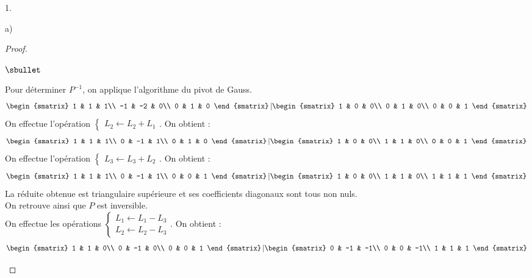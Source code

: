 \begin{noliste}{1.}
\begin{noliste}{a)}
\begin{proof}
\begin{noliste}{$\sbullet$}
	\item Pour déterminer $P^{-1}$, on applique l'algorithme du 
	pivot de Gauss.
	\[
	  \begin{smatrix}
	    1 & 1 & 1\\
	    -1 & -2 & 0\\
	    0 & 1 & 0
	  \end{smatrix}
	  \left\vert 
	  \begin{smatrix}
	    1 & 0 & 0\\
	    0 & 1 & 0\\
	    0 & 0 & 1
	  \end{smatrix}
	  \right.
	\]
	On effectue l'opération $\left\{
	\begin{array}{l}
	  L_2 \leftarrow L_2 + L_1
	\end{array}
	\right.$. On obtient :
	\[
	  \begin{smatrix}
	    1 & 1 & 1\\
	    0 & -1 & 1\\
	    0 & 1 & 0
	  \end{smatrix}
	  \left\vert 
	  \begin{smatrix}
	    1 & 0 & 0\\
	    1 & 1 & 0\\
	    0 & 0 & 1
	  \end{smatrix}
	  \right.
	\]
	On effectue l'opération $\left\{
	\begin{array}{l}
	  L_3 \leftarrow L_3 + L_2
	\end{array}
	\right.$. On obtient :
	\[
	  \begin{smatrix}
	    1 & 1 & 1\\
	    0 & -1 & 1\\
	    0 & 0 & 1
	  \end{smatrix}
	  \left\vert 
	  \begin{smatrix}
	    1 & 0 & 0\\
	    1 & 1 & 0\\
	    1 & 1 & 1
	  \end{smatrix}
	  \right.
	\]
	La réduite obtenue est triangulaire supérieure et ses 
	coefficients diagonaux sont tous non nuls.\\
	On retrouve ainsi que $P$ est inversible.\\
	On effectue les opérations $\left\{
	\begin{array}{l}
	  L_1 \leftarrow L_1 - L_3\\
	  L_2 \leftarrow L_2 - L_3
	\end{array}
	\right.$. On obtient :
	\[
	  \begin{smatrix}
	    1 & 1 & 0\\
	    0 & -1 & 0\\
	    0 & 0 & 1
	  \end{smatrix}
	  \left\vert 
	  \begin{smatrix}
	    0 & -1 & -1\\
	    0 & 0 & -1\\
	    1 & 1 & 1
	  \end{smatrix}
	  \right.
	\]
	

\end{noliste}
\end{proof}
\end{noliste}
\end{noliste}
